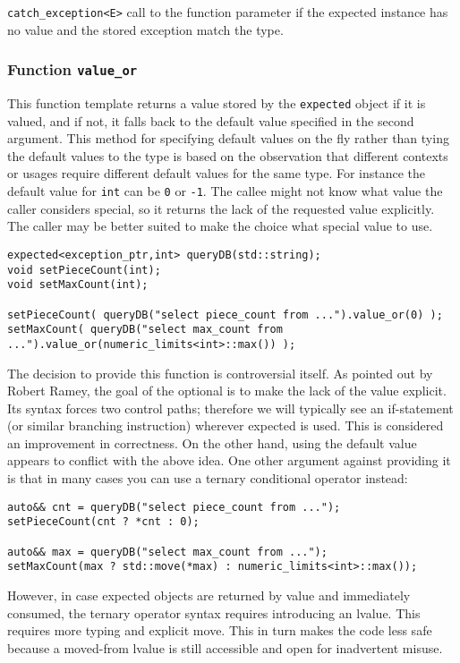 \documentclass[a4paper,10pt]{article}
\newcommand{\cpp}[1]{\lstinline{#1}}
\begin{document}
\cpp{catch_exception<E>} call to the function parameter if the expected instance has no value and the stored exception match the type.

\subsubsection{Function \cpp{value_or}}

This function template returns a value stored by the \cpp{expected} object if it is valued, and if not, it falls back to the default value specified in the second argument. This method for specifying default values on the fly rather than tying the default values to the type is based on the observation that different contexts or usages require different default values for the same type. For instance the default value for \cpp{int} can be \cpp{0} or \cpp{-1}. The callee might not know what value the caller considers special, so it returns the lack of the requested value explicitly. The caller may be better suited to make the choice what special value to use.

\begin{lstlisting}
expected<exception_ptr,int> queryDB(std::string);
void setPieceCount(int);
void setMaxCount(int);

setPieceCount( queryDB("select piece_count from ...").value_or(0) );
setMaxCount( queryDB("select max_count from ...").value_or(numeric_limits<int>::max()) );
\end{lstlisting}

The decision to provide this function is controversial itself. As pointed out by Robert Ramey, the goal of the optional is to make the lack of the value explicit. Its syntax forces two control paths; therefore we will typically see an if-statement (or similar branching instruction) wherever expected is used. This is considered an improvement in correctness. On the other hand, using the default value appears to conflict with the above idea. One other argument against providing it is that in many cases you can use a ternary conditional operator instead:

\begin{lstlisting}
auto&& cnt = queryDB("select piece_count from ...");
setPieceCount(cnt ? *cnt : 0);

auto&& max = queryDB("select max_count from ...");
setMaxCount(max ? std::move(*max) : numeric_limits<int>::max());
\end{lstlisting}

However, in case expected objects are returned by value and immediately consumed, the ternary operator syntax requires introducing an lvalue. This requires more typing and explicit move. This in turn makes the code less safe because a moved-from lvalue is still accessible and open for inadvertent misuse.
\end{document}
